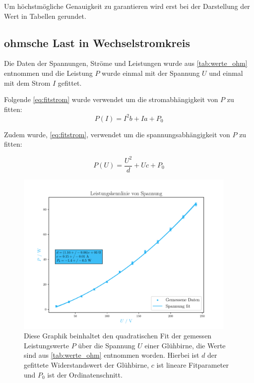 \documentclass[12pt,english,ngerman]{scrartcl}
\begin{document}
Um höchstmögliche Genauigkeit zu garantieren wird erst bei der Darstellung der
Wert in Tabellen gerundet.

\subsection{ohmsche Last in Wechselstromkreis}
Die Daten der Spannungen, Ströme und Leistungen wurde aus
\autoref{tab:werte_ohm} entnommen und die Leistung $P$ wurde einmal mit der
Spannung $U$ und einmal mit dem Strom $I$ gefittet.

Folgende \autoref{eq:fitstrom} wurde verwendet um die stromabhängigkeit von $P$
zu fitten:
\begin{equation}
	P(I) = I^{2} b + I a + P_0
	\label{eq:fitstrom}
\end{equation}

Zudem wurde, \autoref{eq:fitstrom}, verwendet um die spannungsabhängigkeit von
$P$ zu fitten:

\begin{equation}
	P(U) = \frac{U^{2}}{d} + U c + P_0
	\label{eq:fitspannung}
\end{equation}

\begin{figure}[H]
	\begin{center}
		\includegraphics[width = 0.95\textwidth]{figures/pUkennlinie.pdf}
	\end{center}
	\caption[Spannungsabhängige Leistungskurve einer Glühbirne]{ Diese Graphik beinhaltet
		den quadratischen Fit der gemessen Leistungswerte $P$ über die Spannung $U$
		einer Glühbirne, die Werte sind aus \autoref{tab:werte_ohm} entnommen worden.
		Hierbei ist $d$ der gefittete Widerstandswert der Glühbirne, $c$ ist lineare
		Fitparameter und $P_0$ ist der Ordinatenschnitt.
	}\label{fig:pUkennlinie}
\end{figure}
\end{document}
